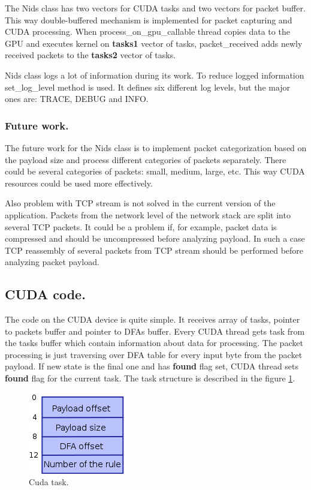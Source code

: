 \documentclass[thesis=M,english]{FITthesis}[2011/07/15]
\begin{document}
The Nids class has two vectors for CUDA tasks and two vectors for packet buffer. This way double-buffered mechanism is implemented for packet capturing and CUDA processing. When process\_on\_gpu\_callable thread copies data to the GPU and executes kernel on \textbf{tasks1} vector of tasks, packet\_received adds newly received packets to the \textbf{tasks2} vector of tasks.

Nids class logs a lot of information during its work. To reduce logged information set\_log\_level method is used. It defines six different log levels, but the major ones are: TRACE, DEBUG and INFO.

\subsubsection*{Future work.}
The future work for the Nids class is to implement packet categorization based on the payload size and process different categories of packets separately. There could be several categories of packets: small, medium, large, etc. This way CUDA resources could be used more effectively.

Also problem with TCP stream is not solved in the current version of the application. Packets from the network level of the network stack are split into several TCP packets. It could be a problem if, for example, packet data is compressed and should be uncompressed before analyzing payload. In such a case TCP reassembly of several packets from TCP stream should be performed before analyzing packet payload.

\subsection{CUDA code.}
The code on the CUDA device is quite simple. It receives array of tasks, pointer to packets buffer and pointer to DFAs buffer. Every CUDA thread gets task from the tasks buffer which contain information about data for processing. The packet processing is just traversing over DFA table for every input byte from the packet payload. If new state is the final one and has \textbf{found} flag  set, CUDA thread sets \textbf{found} flag for the current task. The task structure is described in the figure \ref{fig:cuda_task}.

\begin{figure}[h]
\centering
\includegraphics[scale=0.5]{images/cuda_task.png}
\caption{Cuda task.}
\label{fig:cuda_task}
\end{figure}
\end{document}
